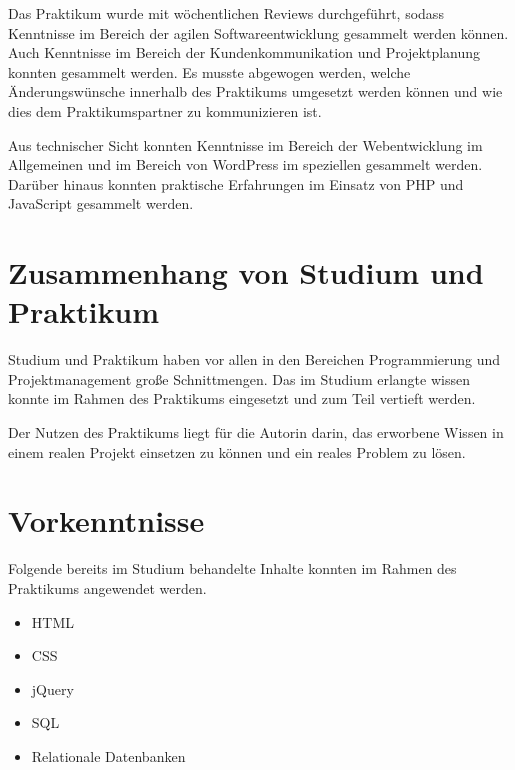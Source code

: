
Das Praktikum wurde mit wöchentlichen Reviews durchgeführt, sodass Kenntnisse im Bereich der agilen Softwareentwicklung gesammelt werden können. Auch Kenntnisse im Bereich der Kundenkommunikation und Projektplanung konnten gesammelt werden. Es musste abgewogen werden, welche Änderungswünsche innerhalb des Praktikums umgesetzt werden können und wie dies dem Praktikumspartner zu kommunizieren ist.

Aus technischer Sicht konnten Kenntnisse im Bereich der Webentwicklung im Allgemeinen und im Bereich von WordPress im speziellen gesammelt werden. Darüber hinaus konnten praktische Erfahrungen im Einsatz von PHP und JavaScript gesammelt werden.


\section{Zusammenhang von Studium und Praktikum}


Studium und Praktikum haben vor allen in den Bereichen Programmierung und Projektmanagement große Schnittmengen. Das im Studium erlangte wissen konnte im Rahmen des Praktikums eingesetzt und zum Teil vertieft werden.

Der Nutzen des Praktikums liegt für die Autorin darin, das erworbene Wissen in einem realen Projekt einsetzen zu können und ein reales Problem zu lösen.


\section{Vorkenntnisse}


Folgende bereits im Studium behandelte Inhalte konnten im Rahmen des Praktikums angewendet werden.

\begin{itemize}
	\item HTML
	\item CSS
	\item jQuery
	\item SQL
	\item Relationale Datenbanken
\end{itemize}


